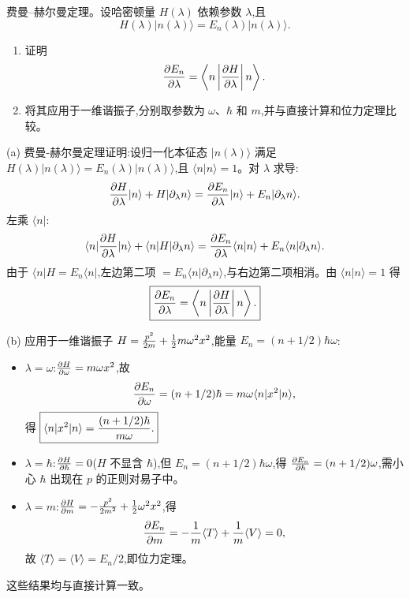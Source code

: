 \begin{question}
费曼--赫尔曼定理。设哈密顿量 $H(\lambda)$ 依赖参数 $\lambda$,且
\[
H(\lambda)|n(\lambda)\rangle=E_n(\lambda)|n(\lambda)\rangle.
\]
\begin{enumerate}
\item 证明
\[
{\partial E_n\over\partial\lambda}=\left\langle n\left|{\partial H\over\partial\lambda}\right|n\right\rangle.
\]
\item 将其应用于一维谐振子,分别取参数为 $\omega$、$\hbar$ 和 $m$,并与直接计算和位力定理比较。
\end{enumerate}
\end{question}
\begin{solution}
(a) 费曼-赫尔曼定理证明:设归一化本征态 $|n(\lambda)\rangle$ 满足 $H(\lambda)|n(\lambda)\rangle = E_n(\lambda)|n(\lambda)\rangle$,且 $\langle n|n\rangle=1$。对 $\lambda$ 求导:
\[
{\partial H\over\partial\lambda}|n\rangle + H|\partial_\lambda n\rangle
= {\partial E_n\over\partial\lambda}|n\rangle + E_n|\partial_\lambda n\rangle.
\]
左乘 $\langle n|$:
\[
\langle n|{\partial H\over\partial\lambda}|n\rangle + \langle n|H|\partial_\lambda n\rangle
= {\partial E_n\over\partial\lambda}\langle n|n\rangle + E_n\langle n|\partial_\lambda n\rangle.
\]
由于 $\langle n|H = E_n\langle n|$,左边第二项 $=E_n\langle n|\partial_\lambda n\rangle$,与右边第二项相消。由 $\langle n|n\rangle=1$ 得
\[
\boxed{{\partial E_n\over\partial\lambda} = \left\langle n\left|{\partial H\over\partial\lambda}\right|n\right\rangle.}
\]

(b) 应用于一维谐振子 $H={p^2\over2m}+{1\over2}m\omega^2x^2$,能量 $E_n=(n+1/2)\hbar\omega$:
\begin{itemize}
\item $\lambda=\omega$:${\partial H\over\partial\omega}=m\omega x^2$,故
  \[
  {\partial E_n\over\partial\omega} = (n+1/2)\hbar = m\omega\langle n|x^2|n\rangle,
  \]
  得 $\boxed{\langle n|x^2|n\rangle = {(n+1/2)\hbar\over m\omega}.}$
\item $\lambda=\hbar$:${\partial H\over\partial\hbar}=0$($H$ 不显含 $\hbar$),但 $E_n=(n+1/2)\hbar\omega$,得 ${\partial E_n\over\partial\hbar}=(n+1/2)\omega$,需小心 $\hbar$ 出现在 $p$ 的正则对易子中。
\item $\lambda=m$:${\partial H\over\partial m} = -{p^2\over2m^2} + {1\over2}\omega^2 x^2$,得
  \[
  {\partial E_n\over\partial m} = -{1\over m}\langle T\rangle + {1\over m}\langle V\rangle = 0,
  \]
  故 $\langle T\rangle = \langle V\rangle = E_n/2$,即位力定理。
\end{itemize}
这些结果均与直接计算一致。
\end{solution}

